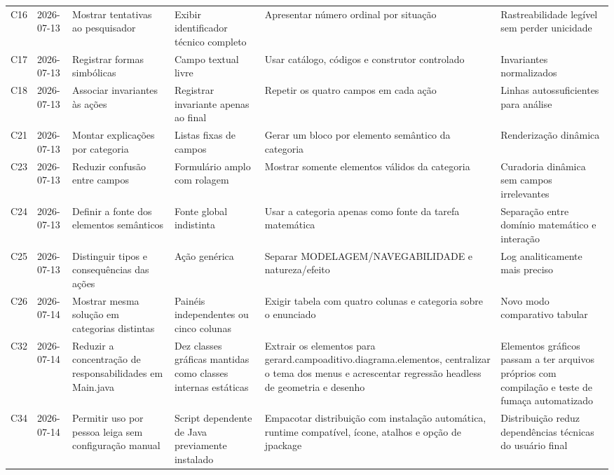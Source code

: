 \begin{landscape}
\begin{longtable}{p{1.0cm}p{1.9cm}p{4.0cm}p{5.0cm}p{6.2cm}p{5.7cm}}
\addlinespace[2pt]
C16 & 2026-07-13 & Mostrar tentativas ao pesquisador & Exibir identificador técnico completo & Apresentar número ordinal por situação & Rastreabilidade legível sem perder unicidade \\
\addlinespace[2pt]
C17 & 2026-07-13 & Registrar formas simbólicas & Campo textual livre & Usar catálogo, códigos e construtor controlado & Invariantes normalizados \\
\addlinespace[2pt]
C18 & 2026-07-13 & Associar invariantes às ações & Registrar invariante apenas ao final & Repetir os quatro campos em cada ação & Linhas autossuficientes para análise \\
\addlinespace[2pt]
C21 & 2026-07-13 & Montar explicações por categoria & Listas fixas de campos & Gerar um bloco por elemento semântico da categoria & Renderização dinâmica \\
\addlinespace[2pt]
C23 & 2026-07-13 & Reduzir confusão entre campos & Formulário amplo com rolagem & Mostrar somente elementos válidos da categoria & Curadoria dinâmica sem campos irrelevantes \\
\addlinespace[2pt]
C24 & 2026-07-13 & Definir a fonte dos elementos semânticos & Fonte global indistinta & Usar a categoria apenas como fonte da tarefa matemática & Separação entre domínio matemático e interação \\
\addlinespace[2pt]
C25 & 2026-07-13 & Distinguir tipos e consequências das ações & Ação genérica & Separar MODELAGEM/NAVEGABILIDADE e natureza/efeito & Log analiticamente mais preciso \\
\addlinespace[2pt]
C26 & 2026-07-14 & Mostrar mesma solução em categorias distintas & Painéis independentes ou cinco colunas & Exigir tabela com quatro colunas e categoria sobre o enunciado & Novo modo comparativo tabular \\
\addlinespace[2pt]
C32 & 2026-07-14 & Reduzir a concentração de responsabilidades em Main.java & Dez classes gráficas mantidas como classes internas estáticas & Extrair os elementos para gerard.campoaditivo.diagrama.elementos, centralizar o tema dos menus e acrescentar regressão headless de geometria e desenho & Elementos gráficos passam a ter arquivos próprios com compilação e teste de fumaça automatizado \\
\addlinespace[2pt]
C34 & 2026-07-14 & Permitir uso por pessoa leiga sem configuração manual & Script dependente de Java previamente instalado & Empacotar distribuição com instalação automática, runtime compatível, ícone, atalhos e opção de jpackage & Distribuição reduz dependências técnicas do usuário final \\

\end{longtable}
\end{landscape}
